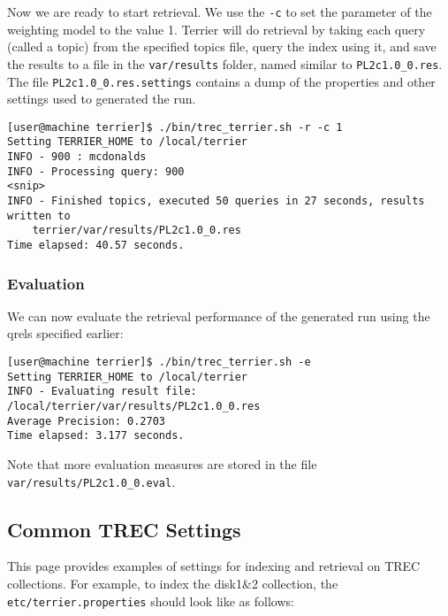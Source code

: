 Now we are ready to start retrieval. We use the \texttt{-c} to set the
parameter of the weighting model to the value 1. Terrier will do
retrieval by taking each query (called a topic) from the specified
topics file, query the index using it, and save the results to a file in
the \texttt{var/results} folder, named similar to
\texttt{PL2c1.0\_0.res}. The file \texttt{PL2c1.0\_0.res.settings}
contains a dump of the properties and other settings used to generated
the run.

\begin{verbatim}
[user@machine terrier]$ ./bin/trec_terrier.sh -r -c 1
Setting TERRIER_HOME to /local/terrier
INFO - 900 : mcdonalds
INFO - Processing query: 900
<snip>
INFO - Finished topics, executed 50 queries in 27 seconds, results written to 
    terrier/var/results/PL2c1.0_0.res
Time elapsed: 40.57 seconds.
\end{verbatim}

\subsubsection{Evaluation}\label{evaluation}

We can now evaluate the retrieval performance of the generated run using
the qrels specified earlier:

\begin{verbatim}
[user@machine terrier]$ ./bin/trec_terrier.sh -e
Setting TERRIER_HOME to /local/terrier
INFO - Evaluating result file: /local/terrier/var/results/PL2c1.0_0.res
Average Precision: 0.2703
Time elapsed: 3.177 seconds.
\end{verbatim}

Note that more evaluation measures are stored in the file
\texttt{var/results/PL2c1.0\_0.eval}.

\href{}{}

\subsection{Common TREC Settings}\label{common-trec-settings}

This page provides examples of settings for indexing and retrieval on
TREC collections. For example, to index the disk1\&2 collection, the
\texttt{etc/terrier.properties} should look like as follows:

